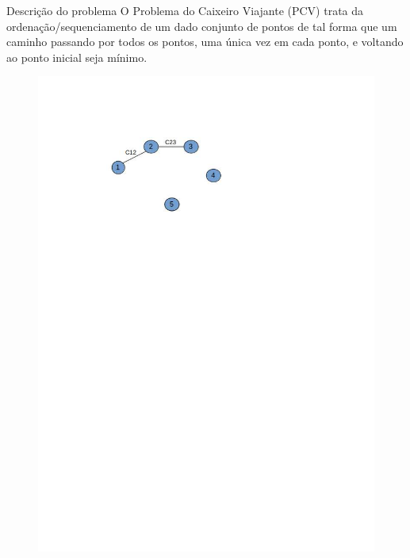 \documentclass[12pt]{beamer}
\begin{document}
\begin{frame}{Descri\c{c}\~ao do problema}
	O Problema do Caixeiro Viajante (PCV) trata da
	ordena\c{c}\~ao/sequenciamento de um dado conjunto de pontos de
	tal forma que um caminho passando por todos os pontos, uma
	\'unica vez em cada ponto, e voltando ao ponto inicial seja
	m\'inimo.
\begin{figure}
		
		\includegraphics[width=1\linewidth]{pontos_2}
		\caption{}
\end{figure}
	
\end{frame}


	
	
	
	
	
	
\end{document}
